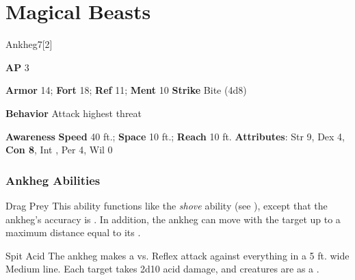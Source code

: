 \section{Magical Beasts}
\begin{monsection}{Ankheg}{7}[2]
\vspace{-1em}\vspace{-1em}
\begin{spellcontent}
\begin{spelltargetinginfo}
{\textbf{AP} 3}

\pari \textbf{Armor} 14;
\textbf{Fort} 18;
\textbf{Ref} 11;
\textbf{Ment} 10
\pari \textbf{Strike} Bite  (4d8)



\pari \textbf{Behavior} Attack highest threat
\end{spelltargetinginfo}
\end{spellcontent}

\begin{monsterfooter}
\pari \textbf{Awareness} 
\pari \textbf{Speed} 40 ft.;
\textbf{Space} 10 ft.;
\textbf{Reach} 10 ft.
\pari \textbf{Attributes}:
Str 9,
Dex 4,
\textbf{Con 8},
Int ,
Per 4,
Wil 0
\end{monsterfooter}
\end{monsection}


\subsubsection{Ankheg Abilities}

\begin{ability}{Drag Prey}
This ability functions like the \textit{shove} ability (see ), except that the ankheg's accuracy is .
In addition, the ankheg can move with the target up to a maximum distance equal to its .
\end{ability}

\vspace{0.5em}
\begin{ability}{Spit Acid}
The ankheg makes a  vs. Reflex attack against everything in a 5 ft. wide Medium line.
\hit Each target takes 2d10 acid damage, and creatures are  as a .
\end{ability}

